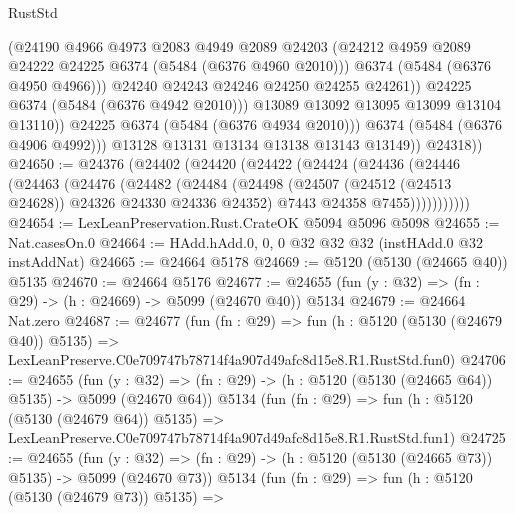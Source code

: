 \begin{lexlean}{RustStd}
\begin{coremodule}
                          (@24190
                            @4966
                            @4973
                            @2083
                            @4949
                            @2089
                            @24203
                            (@24212 @4959 @2089 @24222 @24225 @6374 (@5484 (@6376 @4960 @2010)))
                            @6374
                            (@5484 (@6376 @4950 @4966)))
                          @24240
                          @24243
                          @24246
                          @24250
                          @24255
                          @24261))
                      @24225
                      @6374
                      (@5484 (@6376 @4942 @2010)))
                    @13089
                    @13092
                    @13095
                    @13099
                    @13104
                    @13110))
                @24225
                @6374
                (@5484 (@6376 @4934 @2010)))
              @6374
              (@5484 (@6376 @4906 @4992)))
            @13128
            @13131
            @13134
            @13138
            @13143
            @13149))
        @24318))
@24650 := @24376
    (@24402
      (@24420
        (@24422
          (@24424
            (@24436
              (@24446
                (@24463
                  (@24476
                    (@24482
                      (@24484
                        (@24498
                          (@24507 (@24512 (@24513 @24628)) @24326 @24330 @24336 @24352)
                          @7443
                          @24358
                          @7455)))))))))))
@24654 := LexLeanPreservation.Rust.CrateOK @5094 @5096 @5098
@24655 := Nat.casesOn.{0}
@24664 := HAdd.hAdd.{0, 0, 0} @32 @32 @32 (instHAdd.{0} @32 instAddNat)
@24665 := @24664 @5178
@24669 := @5120 (@5130 (@24665 @40)) @5135
@24670 := @24664 @5176
@24677 := @24655 (fun (y : @32) => (fn : @29) -> (h : @24669) -> @5099 (@24670 @40)) @5134
@24679 := @24664 Nat.zero
@24687 := @24677
    (fun (fn : @29) =>
    fun (h : @5120 (@5130 (@24679 @40)) @5135) =>
    LexLeanPreserve.C0e709747b78714f4a907d49afc8d15e8.R1.RustStd.fun0)
@24706 := @24655
    (fun (y : @32) => (fn : @29) -> (h : @5120 (@5130 (@24665 @64)) @5135) -> @5099 (@24670 @64))
    @5134
    (fun (fn : @29) =>
    fun (h : @5120 (@5130 (@24679 @64)) @5135) =>
    LexLeanPreserve.C0e709747b78714f4a907d49afc8d15e8.R1.RustStd.fun1)
@24725 := @24655
    (fun (y : @32) => (fn : @29) -> (h : @5120 (@5130 (@24665 @73)) @5135) -> @5099 (@24670 @73))
    @5134
    (fun (fn : @29) =>
    fun (h : @5120 (@5130 (@24679 @73)) @5135) =>

\end{coremodule}
\end{lexlean}
